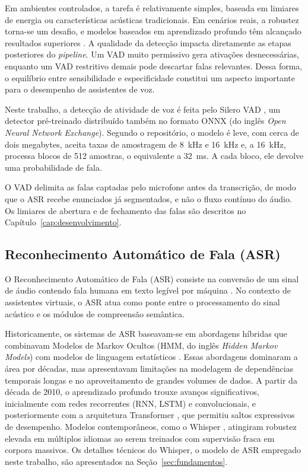 \documentclass[
    12pt,                %
    openright,           %
    oneside,             %
    a4paper,             %
    english,             %
    brazil               %
]{abntex2}
\begin{document}
Em ambientes controlados, a tarefa é relativamente simples, baseada em limiares de energia ou características acústicas tradicionais. Em cenários reais, a robustez torna-se um desafio, e modelos baseados em aprendizado profundo têm alcançado resultados superiores \cite{Li2021}. A qualidade da detecção impacta diretamente as etapas posteriores do \textit{pipeline}. Um VAD muito permissivo gera ativações desnecessárias, enquanto um VAD restritivo demais pode descartar falas relevantes. Dessa forma, o equilíbrio entre sensibilidade e especificidade constitui um aspecto importante para o desempenho de assistentes de voz.

Neste trabalho, a detecção de atividade de voz é feita pelo Silero VAD \cite{Silero2026}, um detector pré-treinado distribuído também no formato ONNX (do inglês \textit{Open Neural Network Exchange}). Segundo o repositório, o modelo é leve, com cerca de dois megabytes, aceita taxas de amostragem de 8~kHz e 16~kHz e, a 16~kHz, processa blocos de 512 amostras, o equivalente a 32~ms. A cada bloco, ele devolve uma probabilidade de fala.

O VAD delimita as falas captadas pelo microfone antes da transcrição, de modo que o ASR recebe enunciados já segmentados, e não o fluxo contínuo do áudio. Os limiares de abertura e de fechamento das falas são descritos no Capítulo~\ref{cap:desenvolvimento}.


\subsection{Reconhecimento Automático de Fala (ASR)}

O Reconhecimento Automático de Fala (ASR) consiste na conversão de um sinal de áudio contendo fala humana em texto legível por máquina \cite{Jurafsky2026}. No contexto de assistentes virtuais, o ASR atua como ponte entre o processamento do sinal acústico e os módulos de compreensão semântica.

Historicamente, os sistemas de ASR baseavam-se em abordagens híbridas que combinavam Modelos de Markov Ocultos (HMM, do inglês \textit{Hidden Markov Models}) com modelos de linguagem estatísticos \cite{Jurafsky2026}. Essas abordagens dominaram a área por décadas, mas apresentavam limitações na modelagem de dependências temporais longas e no aproveitamento de grandes volumes de dados. A partir da década de 2010, o aprendizado profundo trouxe avanços significativos, inicialmente com redes recorrentes (RNN, LSTM) e convolucionais, e posteriormente com a arquitetura Transformer \cite{Vaswani2017}, que permitiu saltos expressivos de desempenho. Modelos contemporâneos, como o Whisper \cite{Radford2023}, atingiram robustez elevada em múltiplos idiomas ao serem treinados com supervisão fraca em corpora massivos. Os detalhes técnicos do Whisper, o modelo de ASR empregado neste trabalho, são apresentados na Seção~\ref{sec:fundamentos}.
\end{document}
